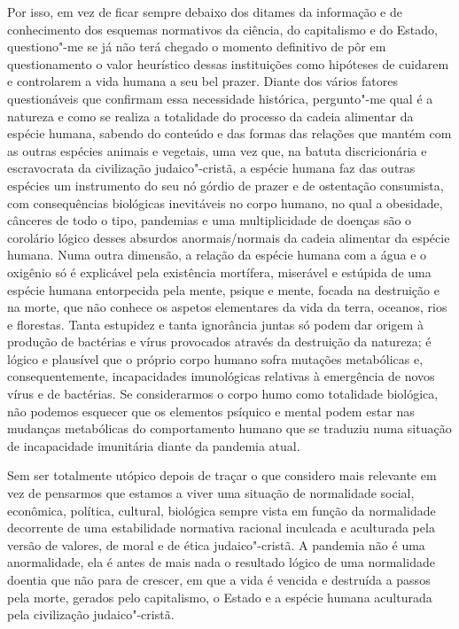 Por isso, em vez de ficar sempre debaixo dos ditames da informação e de
conhecimento dos esquemas normativos da ciência, do capitalismo e do
Estado, questiono"-me se já não terá chegado o momento definitivo de pôr
em questionamento o valor heurístico dessas instituições como hipóteses
de cuidarem e controlarem a vida humana a seu bel prazer. Diante dos
vários fatores questionáveis que confirmam essa necessidade histórica,
pergunto"-me qual é a natureza e como se realiza a totalidade do processo
da cadeia alimentar da espécie humana, sabendo do conteúdo e das formas
das relações que mantém com as outras espécies animais e vegetais, uma
vez que, na batuta discricionária e escravocrata da civilização
judaico"-cristã, a espécie humana faz das outras espécies um instrumento
do seu nó górdio de prazer e de ostentação consumista, com consequências
biológicas inevitáveis no corpo humano, no qual a obesidade, cânceres de
todo o tipo, pandemias e uma multiplicidade de doenças são o corolário
lógico desses absurdos anormais/normais da cadeia alimentar da espécie
humana. Numa outra dimensão, a relação da espécie humana com a água e o
oxigênio só é explicável pela existência mortífera, miserável e estúpida
de uma espécie humana entorpecida pela mente, psique e mente, focada na
destruição e na morte, que não conhece os aspetos elementares da vida da
terra, oceanos, rios e florestas. Tanta estupidez e tanta ignorância
juntas só podem dar origem à produção de bactérias e vírus provocados
através da destruição da natureza; é lógico e plausível que o próprio
corpo humano sofra mutações metabólicas e, consequentemente,
incapacidades imunológicas relativas à emergência de novos vírus e de
bactérias. Se considerarmos o corpo humo como totalidade biológica, não
podemos esquecer que os elementos psíquico e mental podem estar nas
mudanças metabólicas do comportamento humano que se traduziu numa
situação de incapacidade imunitária diante da pandemia atual.

Sem ser totalmente utópico depois de traçar o que considero mais
relevante em vez de pensarmos que estamos a viver uma situação de
normalidade social, econômica, política, cultural, biológica sempre
vista em função da normalidade decorrente de uma estabilidade normativa
racional inculcada e aculturada pela versão de valores, de moral e de
ética judaico"-cristã. A pandemia não é uma anormalidade, ela é antes de
mais nada o resultado lógico de uma normalidade doentia que não para de
crescer, em que a vida é vencida e destruída a passos pela morte,
gerados pelo capitalismo, o Estado e a espécie humana aculturada pela
civilização judaico"-cristã.

